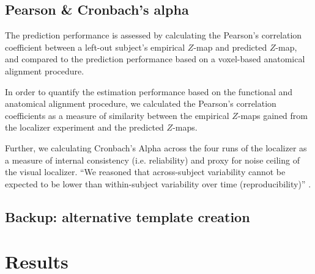 \subsection{Pearson \& Cronbach's alpha}

%
The prediction performance is assessed by calculating the Pearson's correlation
coefficient between a left-out subject's empirical $Z$-map and predicted
$Z$-map, and compared to the prediction performance based on a voxel-based
anatomical alignment procedure.

In order to quantify the estimation performance based on the functional and
anatomical alignment procedure, we calculated the Pearson's correlation
coefficients as a measure of similarity between the empirical $Z$-maps gained
from the localizer experiment and the predicted $Z$-maps.

Further, we calculating Cronbach's Alpha across the four runs of the localizer
as a measure of internal consistency (i.e.  reliability) and proxy for noise
ceiling of the visual localizer.
%
``We reasoned that across-subject variability cannot be expected to be lower
than within-subject variability over time (reproducibility)''
\citep{rosenke2021probabilistic}.


\subsection{Backup: alternative template creation}








\section{Results}

